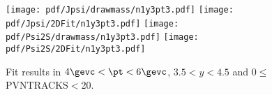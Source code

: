 \begin{figure}[H]
\begin{center}
\texttt{[image: pdf/Jpsi/drawmass/n1y3pt3.pdf]}
\texttt{[image: pdf/Jpsi/2DFit/n1y3pt3.pdf]}
\vspace*{-0.5cm}
\texttt{[image: pdf/Psi2S/drawmass/n1y3pt3.pdf]}
\texttt{[image: pdf/Psi2S/2DFit/n1y3pt3.pdf]}
\vspace*{-0.5cm}
\end{center}
\caption{Fit results in $4\gevc<\pt<6\gevc$, $3.5<y<4.5$ and 0$\leq$PVNTRACKS$<$20.}
\label{Fitn1y3pt3}
\end{figure}
